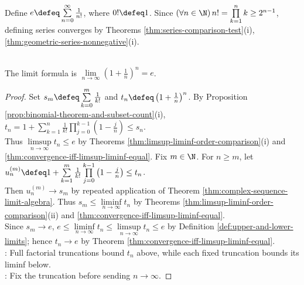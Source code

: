 \begin{illustrationfigure}[H]
  \centering
  
  \caption{Left and right endpoint estimates for decreasing $f\geq0$.}
  \label{fig:integral-test-step-functions}
\end{illustrationfigure}

\begin{definition} \label{def:number-e-by-series} \\
Define $e\defeq\sum\limits_{n=0}^{\infty}\frac{1}{n!}$, where $0!\defeq1$. Since $(\forall n\in\N)\,n!=\prod\limits_{k=1}^{n}k\geq2^{n-1}$, defining series converges by Theorems \ref{thm:series-comparison-test}(i), \ref{thm:geometric-series-nonnegative}(i).
\end{definition}

\begin{theorem} \label{thm:e-as-binomial-limit} \\
The limit formula is $\lim\limits_{n\to\infty}\left(1+\frac{1}{n}\right)^n=e$.
\begin{proof}
Set $s_m\defeq\sum\limits_{k=0}^{m}\frac{1}{k!}$ and $t_n\defeq\left(1+\frac{1}{n}\right)^n$. By Proposition \ref{prop:binomial-theorem-and-subset-count}(i), $t_n=1+\sum\limits_{k=1}^{n}\frac{1}{k!}\prod\limits_{j=0}^{k-1}\left(1-\frac{j}{n}\right)\leq s_n$.\\
Thus $\limsup\limits_{n\to\infty}t_n\leq e$ by Theorems \ref{thm:limsup-liminf-order-comparison}(i) and \ref{thm:convergence-iff-limsup-liminf-equal}. Fix $m\in\N$. For $n\geq m$, let $u_n^{(m)}\defeq1+\sum\limits_{k=1}^{m}\frac{1}{k!}\prod\limits_{j=0}^{k-1}\left(1-\frac{j}{n}\right)\leq t_n$.\\
Then $u_n^{(m)}\to s_m$ by repeated application of Theorem \ref{thm:complex-sequence-limit-algebra}. Thus $s_m\leq\liminf\limits_{n\to\infty}t_n$ by Theorems \ref{thm:limsup-liminf-order-comparison}(ii) and \ref{thm:convergence-iff-limsup-liminf-equal}.\\
Since $s_m\to e$, $e\leq\liminf\limits_{n\to\infty}t_n\leq\limsup\limits_{n\to\infty}t_n\leq e$ by Definition \ref{def:upper-and-lower-limits}; hence $t_n\to e$ by Theorem \ref{thm:convergence-iff-limsup-liminf-equal}.\\
: Full factorial truncations bound $t_n$ above, while each fixed truncation bounds its liminf below.\\
: Fix the truncation before sending $n\to\infty$.
\end{proof}
\end{theorem}

